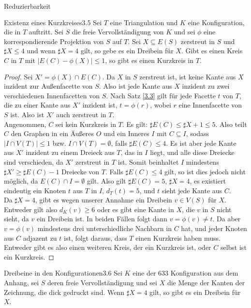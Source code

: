 \begin{section}{Reduzierbarkeit}
 \begin{satzl}{Existenz eines Kurzkreises}{3.5}
  Sei $T$ eine Triangulation und $K$ eine Konfiguration, die in $T$ auftritt. Sei $S$ die freie Vervollständigung von $K$ und sei $\phi$ eine korrespondierende Projektion von $S$ auf $T$. Sei $X \subseteq E(S)$ zerstreut in $S$ und $\sharp X \leq 4$ und wenn $\sharp X = 4$ gilt, so gebe es ein Dreibein für $X$. Gibt es einen Kreis $C$ in $T$ mit $|E(C) - \phi(X)| \leq 1$, so gibt es einen Kurzkreis in $T$.
 \end{satzl}
 \begin{proof}
  Sei $X' = \phi(X) \cap E(C)$. Da $X$ in $S$ zerstreut ist, ist keine Kante aus $X$ inzident zur Außenfacette von $S$. Also ist jede Kante aus $X$ inzident zu zwei verschiedenen Innenfacetten von $S$. Nach Satz \ref{3.3} gilt für jede Facette $t$ von $T$, die zu einer Kante aus $X'$ inzident ist, $t=\phi(r)$, wobei $r$ eine Innenfacette von $S$ ist. Also ist $X'$ auch zerstreut in $T$.\\
  Angenommen, $C$ sei kein Kurzkreis in $T$. Es gilt: $\sharp E(C) \leq \sharp X +1 \leq 5$. Also teilt $C$ den Graphen in ein Äußeres $O$ und ein Inneres $I$ mit $C \subseteq I$, sodass $|I \cap V(T)| \leq 1$ bzw. $I \cap V(T) = \emptyset$, falls $\sharp E(C) \leq 4$. Es ist aber jede Kante aus $X'$ inzident zu einem Dreieck aus $T$, das in $I$ liegt, und alle diese Dreiecke sind verschieden, da $X'$ zerstreut in $T$ ist. Somit beinhaltet $I$ mindestens $\sharp X' \geq \sharp E(C) -1$ Dreiecke von $T$. Falls $\sharp E(C) \leq 4$ gilt, so ist dies jedoch nicht möglich, da $E(C) \cap I = \emptyset$ gilt. Also gilt $\sharp E(C) = 5$, $\sharp X = 4$, es existiert eindeutig ein Knoten $t$ aus $T$ in $I$, $d_T(t) = 5$, und $t$ sieht jede Kante aus $C$.\\
  Da $\sharp X = 4$, gibt es wegen unserer Annahme ein Dreibein $v\in V(S)$ für $X$. Entweder gilt also $d_K(v) \geq 6$ oder es gibt eine Kante in $X$, die $v$ in $S$ nicht sieht, da $v$ ein Dreibein ist. In beiden Fällen folgt dann $v=\phi(v)\neq t$. Da aber $v=\phi(v)$ mindestens drei unterschiedliche Nachbarn in $C$ hat, und jeder Knoten aus $C$ adjazent zu $t$ ist, folgt daraus, dass $T$ einen Kurzkreis haben muss. \\
  Entweder gibt es also einen weiteren Kreis, der ein Kurzkreis ist, oder $C$ selbst ist ein Kurzkreis.
 \end{proof}
 
 \begin{satzl}{Dreibeine in den Konfigurationen}{3.6}
  Sei $K$ eine der 633 Konfiguration aus dem Anhang, sei $S$ deren freie Vervollständigung und sei $X$ die Menge der Kanten der Zeichnung, die dick gedruckt sind. Wenn $\sharp X = 4$ gilt, so gibt es ein Dreibein für $X$.
 \end{satzl}
 

\end{section}
